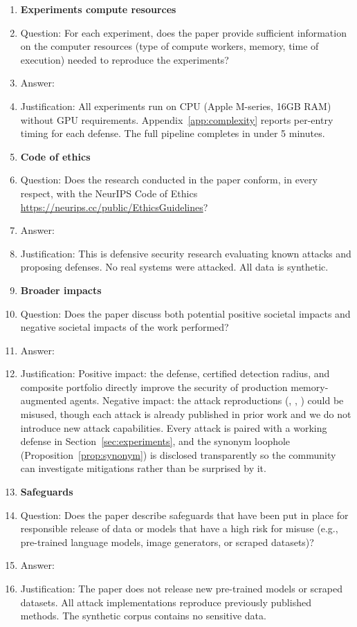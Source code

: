 \begin{enumerate}
\item {\bf Experiments compute resources}
    \item[] Question: For each experiment, does the paper provide sufficient information on the computer resources (type of compute workers, memory, time of execution) needed to reproduce the experiments?
    \item[] Answer: \answerYes{}
    \item[] Justification: All experiments run on CPU (Apple M-series, 16GB RAM) without GPU requirements. Appendix~\ref{app:complexity} reports per-entry timing for each defense. The full pipeline completes in under 5 minutes.

\item {\bf Code of ethics}
    \item[] Question: Does the research conducted in the paper conform, in every respect, with the NeurIPS Code of Ethics \url{https://neurips.cc/public/EthicsGuidelines}?
    \item[] Answer: \answerYes{}
    \item[] Justification: This is defensive security research evaluating known attacks and proposing defenses. No real systems were attacked. All data is synthetic.

\item {\bf Broader impacts}
    \item[] Question: Does the paper discuss both potential positive societal impacts and negative societal impacts of the work performed?
    \item[] Answer: \answerYes{}
    \item[] Justification: Positive impact: the \memsad{} defense, certified detection radius, and composite portfolio directly improve the security of production memory-augmented agents. Negative impact: the attack reproductions (\agentpoison{}, \minja{}, \injecmem{}) could be misused, though each attack is already published in prior work and we do not introduce new attack capabilities. Every attack is paired with a working defense in Section~\ref{sec:experiments}, and the synonym loophole (Proposition~\ref{prop:synonym}) is disclosed transparently so the community can investigate mitigations rather than be surprised by it.

\item {\bf Safeguards}
    \item[] Question: Does the paper describe safeguards that have been put in place for responsible release of data or models that have a high risk for misuse (e.g., pre-trained language models, image generators, or scraped datasets)?
    \item[] Answer: \answerNA{}
    \item[] Justification: The paper does not release new pre-trained models or scraped datasets. All attack implementations reproduce previously published methods. The synthetic corpus contains no sensitive data.


\end{enumerate}
